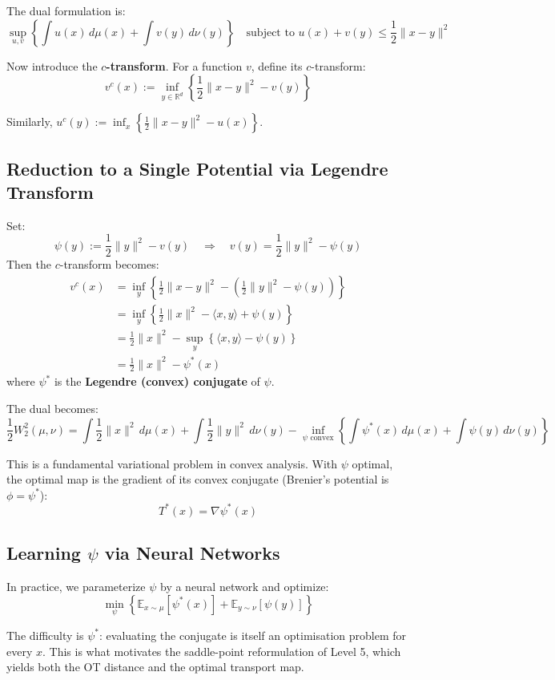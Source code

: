 \documentclass[11pt]{article}
\begin{document}
The dual formulation is:
\[
\sup_{u, v} \left\{ \int u(x)\,d\mu(x) + \int v(y)\,d\nu(y) \right\} \quad \text{subject to } u(x) + v(y) \leq \frac{1}{2}\|x - y\|^2
\]

Now introduce the \textbf{$c$-transform}. For a function $v$, define its $c$-transform:
\[
v^c(x) := \inf_{y \in \mathbb{R}^d} \left\{ \frac{1}{2}\|x - y\|^2 - v(y) \right\}
\]

Similarly, $u^c(y) := \inf_{x} \left\{ \frac{1}{2}\|x - y\|^2 - u(x) \right\}$.

\subsection*{Reduction to a Single Potential via Legendre Transform}
Set:
\[
\psi(y) := \frac{1}{2}\|y\|^2 - v(y)
\quad \Rightarrow \quad v(y) = \frac{1}{2}\|y\|^2 - \psi(y)
\]
Then the $c$-transform becomes:
\begin{align*}
v^c(x)
&= \inf_y \left\{ \frac{1}{2}\|x - y\|^2 - \left( \frac{1}{2}\|y\|^2 - \psi(y) \right) \right\} \\
&= \inf_y \left\{ \frac{1}{2}\|x\|^2 - \langle x, y \rangle + \psi(y) \right\} \\
&= \frac{1}{2}\|x\|^2 - \sup_y \left\{ \langle x, y \rangle - \psi(y) \right\} \\
&= \frac{1}{2}\|x\|^2 - \psi^*(x)
\end{align*}
where $\psi^*$ is the \textbf{Legendre (convex) conjugate} of $\psi$.

The dual becomes:
\[
\frac{1}{2} W_2^2(\mu, \nu) = \int \frac{1}{2}\|x\|^2 \, d\mu(x) + \int \frac{1}{2}\|y\|^2 \, d\nu(y) - \inf_{\psi \text{ convex}} \left\{ \int \psi^*(x) \, d\mu(x) + \int \psi(y) \, d\nu(y) \right\}
\]

This is a fundamental variational problem in convex analysis. With $\psi$ optimal, the optimal map is the gradient of its convex conjugate (Brenier's potential is $\phi = \psi^*$):
\[
T^*(x) = \nabla \psi^*(x)
\]

\subsection*{Learning $\psi$ via Neural Networks}
In practice, we parameterize $\psi$ by a neural network and optimize:
\[
\min_\psi \left\{ \mathbb{E}_{x \sim \mu}[\psi^*(x)] + \mathbb{E}_{y \sim \nu}[\psi(y)] \right\}
\]

The difficulty is $\psi^*$: evaluating the conjugate is itself an optimisation problem for every $x$. This is what motivates the saddle-point reformulation of Level 5, which yields both the OT distance and the optimal transport map.
\end{document}
